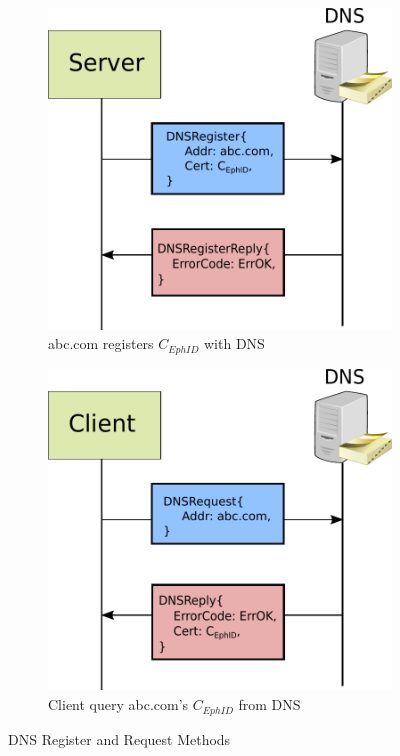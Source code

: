 \begin{figure}[th!]
\centering
\begin{subfigure}{.5\textwidth}
  \centering
  \includegraphics[width=0.95\linewidth]{Figures/dns_register.pdf}
  \caption[DNS Register Domain]{abc.com registers $C_{EphID}$ with DNS}
  \label{fig:dns_register}
\end{subfigure}%
\begin{subfigure}{.5\textwidth}
  \centering
  \includegraphics[width=0.95\linewidth]{Figures/dns_request.pdf}
  \caption[DNS Request for a Domain]{Client query abc.com's $C_{EphID}$ from DNS}
  \label{fig:dns_request}
\end{subfigure}
\caption{DNS Register and Request Methods}
\label{fig:dns}
\end{figure}

